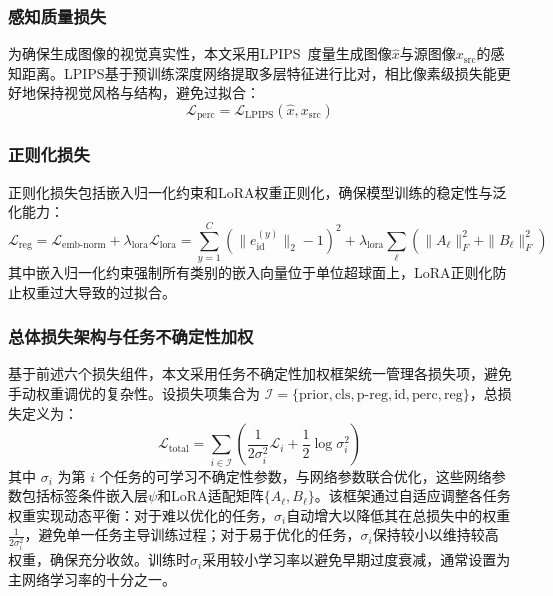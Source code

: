 \subsubsection{感知质量损失}

为确保生成图像的视觉真实性，本文采用LPIPS~\cite{zhang2018unreasonable}度量生成图像$\hat{x}$与源图像$x_{\text{src}}$的感知距离。LPIPS基于预训练深度网络提取多层特征进行比对，相比像素级损失能更好地保持视觉风格与结构，避免过拟合：
\begin{equation}\label{eq:mia_perception_combined}
    \mathcal{L}_{\text{perc}} = \mathcal{L}_{\text{LPIPS}}(\hat{x}, x_{\text{src}})
\end{equation}

\subsubsection{正则化损失}
\label{subsec:mia_regularization}

正则化损失包括嵌入归一化约束和LoRA权重正则化，确保模型训练的稳定性与泛化能力：
\begin{equation}\label{eq:mia_reg_loss}
    \mathcal{L}_{\text{reg}} = \mathcal{L}_{\text{emb-norm}} + \lambda_{\text{lora}} \mathcal{L}_{\text{lora}} = \sum_{y=1}^C (\|e_{\text{id}}^{(y)}\|_2 - 1)^2 + \lambda_{\text{lora}} \sum_{\ell} (\|A_{\ell}\|_F^2 + \|B_{\ell}\|_F^2)
\end{equation}
其中嵌入归一化约束强制所有类别的嵌入向量位于单位超球面上，LoRA正则化防止权重过大导致的过拟合。

\subsubsection{总体损失架构与任务不确定性加权}

基于前述六个损失组件，本文采用任务不确定性加权框架统一管理各损失项，避免手动权重调优的复杂性。设损失项集合为 $\mathcal{I} = \{\text{prior}, \text{cls}, \text{p-reg}, \text{id}, \text{perc}, \text{reg}\}$，总损失定义为：
\begin{equation}\label{eq:mia_total_loss}
    \mathcal{L}_{\text{total}} = \sum_{i \in \mathcal{I}} \left( \frac{1}{2\sigma_i^2} \mathcal{L}_i + \frac{1}{2}\log\sigma_i^2 \right)
\end{equation}
其中 $\sigma_i$ 为第 $i$ 个任务的可学习不确定性参数，与网络参数联合优化，这些网络参数包括标签条件嵌入层$\psi$和LoRA适配矩阵$\{A_\ell, B_\ell\}$。该框架通过自适应调整各任务权重实现动态平衡：对于难以优化的任务，$\sigma_i$自动增大以降低其在总损失中的权重$\frac{1}{2\sigma_i^2}$，避免单一任务主导训练过程；对于易于优化的任务，$\sigma_i$保持较小以维持较高权重，确保充分收敛。训练时$\sigma_i$采用较小学习率以避免早期过度衰减，通常设置为主网络学习率的十分之一。

